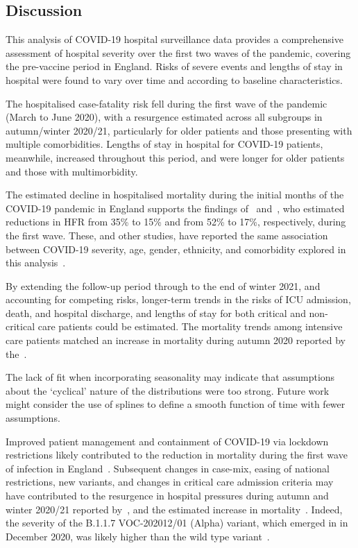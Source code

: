 \subsection{Discussion}

This analysis of COVID-19 hospital surveillance data provides a comprehensive assessment of hospital severity over the first two waves of the pandemic, covering the pre-vaccine period in England. Risks of severe events and lengths of stay in hospital were found to vary over time and according to baseline characteristics.

The hospitalised case-fatality risk fell during the first wave of the pandemic (March to June 2020), with a resurgence estimated across all subgroups in autumn/winter 2020/21, particularly for older patients and those presenting with multiple comorbidities. Lengths of stay in hospital for COVID-19 patients, meanwhile, increased throughout this period, and were longer for older patients and those with multimorbidity.

The estimated decline in hospitalised mortality during the initial months of the COVID-19 pandemic in England supports the findings of~\cite{Docherty2020-mr} and~\cite{Gray2021-xk}, who estimated reductions in HFR from 35\% to 15\% and from 52\% to 17\%, respectively, during the first wave. These, and other studies, have reported the same association between COVID-19 severity, age, gender, ethnicity, and comorbidity explored in this analysis~\parencite{Williamson2020-xk, Navaratnam2021-ak}.

By extending the follow-up period through to the end of winter 2021, and accounting for competing risks, longer-term trends in the risks of ICU admission, death, and hospital discharge, and lengths of stay for both critical and non-critical care patients could be estimated. The mortality trends among intensive care patients matched an increase in mortality during autumn 2020 reported by the~\cite{Intensive-Care-National-Audit-and-Research-Centre2021-vs}.

The lack of fit when incorporating seasonality may indicate that assumptions about the `cyclical' nature of the distributions were too strong. Future work might consider the use of splines to define a smooth function of time with fewer assumptions.

Improved patient management and containment of COVID-19 via lockdown restrictions likely contributed to the reduction in mortality during the first wave of infection in England~\parencite{Recovery-Collaborative-Group2020-gi, Bamford2020-vh, Davies2020-kk}. Subsequent changes in case-mix, easing of national restrictions, new variants, and changes in critical care admission criteria may have contributed to the resurgence in hospital pressures during autumn and winter 2020/21 reported by~\cite{Roxby2020-vy}, and the estimated increase in mortality~\parencite{National_Health_Service2020-ue}. Indeed, the severity of the B.1.1.7 VOC-202012/01 (Alpha) variant, which emerged in in December 2020, was likely higher than the wild type variant~\parencite{Davies2021-ua, Scientific_Advisory_Group_for_Emergencies2021-wj, Nyberg2021-cr}.

